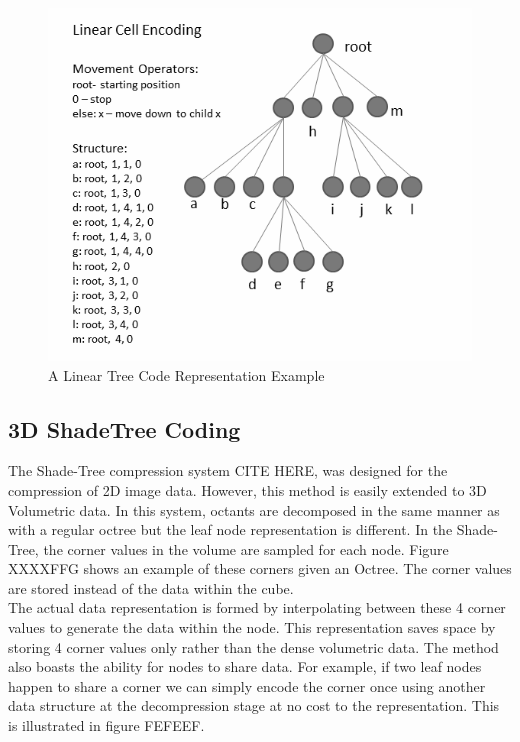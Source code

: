 \begin{figure}[!h]
\centering
\includegraphics[width=12cm]{images/ch2/LinearCellCodeRepresentation}
\caption{A Linear Tree Code Representation Example}
\label{LinearCellCodeRepresentation}
\end{figure}



\subsection{3D ShadeTree Coding}
\label{sec:dr:coding}
The Shade-Tree compression system CITE HERE, was designed for the compression of 2D image data. However, this method is easily extended to 3D Volumetric data. In this system, octants are decomposed in the same manner as with a regular octree but the leaf node representation is different. In the Shade-Tree, the corner values in the volume are sampled for each node. Figure XXXXFFG shows an example of these corners given an Octree. The corner values are stored instead of the data within the cube. \\


The actual data representation is formed by interpolating between these 4 corner values to generate the data within the node. This representation saves space by storing 4 corner values only rather than the dense volumetric data. The method also boasts the ability for nodes to share data. For example, if two leaf nodes happen to share a corner we can simply encode the corner once using another data structure at the decompression stage at no cost to the representation. This is illustrated in figure FEFEEF. \\

